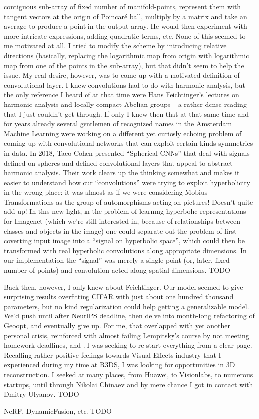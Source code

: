 contiguous sub-array of fixed number of manifold-points, represent them with
tangent vectors at the origin of Poincar\'e ball, multiply by a matrix and take
an average to produce a point in the output array. He would then experiment
with more intricate expressions, adding quadratic terms, etc. None of this seemed
to me motivated at all. I tried to modify the scheme by introducing relative
directions (basically, replacing the logarithmic map from origin with
logarithmic map from one of the points in the sub-array), but that didn't seem
to help the issue. My real desire, however, was to come up with a motivated
definition of convolutional layer. I knew convolutions had to do with harmonic analysis,
but the only reference I heard of at that time were Hans Feichtinger's lectures
on harmonic analysis and locally compact Abelian groups -- a rather dense
reading that I just couldn't get through. If only I knew then that at that same
time and for years already several gentlemen of recognized names in the
Amsterdam Machine Learning were working on a different yet curiosly echoing
problem of coming up with convolutional networks that can exploit certain kinds
symmetries in data. In 2018, Taco Cohen presented ``Spherical CNNs'' that deal
with signals defined on spheres and defined convolutional layers that appeal to
abstract harmonic analysis. Their work clears up the thinking somewhat and
makes it easier to understand how our ``convolutions'' were trying to exploit
hyperbolicity in the wrong place: it was almost as if we were considering
Mobius Transformations as the group of automorphisms acting on pictures!
Doesn't quite add up! In this new light, in the problem of learning hyperbolic
representations for Imagenet (which we're still interested in, because of
relationships between classes and objects in the image) one could separate out
the problem of first coverting input image into a ``signal on hyperbolic
space'', which could then be transformed with real hyperbolic convolutions
along appropriate dimensions. In our implementation the ``signal'' was merely a
single point (or, later, fixed number of points) and convolution acted along
spatial dimensions. TODO

Back then, however, I only knew about Feichtinger. Our model seemed to give
surprising results overfitting CIFAR with just about one hundred thousand
parameters, but no kind regularization could help getting a generalizable
model. We'd push until after NeurIPS deadline, then delve into month-long
refactoring of Geoopt, and eventually give up. For me, that overlapped with yet
another personal crisis, reinforced with almost failing Lempitsky's course by
not meeting homework deadlines, and .
I was seeking to re-start everything from a clear page. Recalling rather
positive feelings towards Visual Effects industry that I experienced during my
time at R3DS, I was looking for opportunities in 3D reconstruction. I seeked at
many places, from Huawei, to Visionlabs, to numerous startups, until through
Nikolai Chinaev and by mere chance I got in contact with Dmitry Ulyanov. TODO

NeRF, DynamicFusion, etc. TODO
